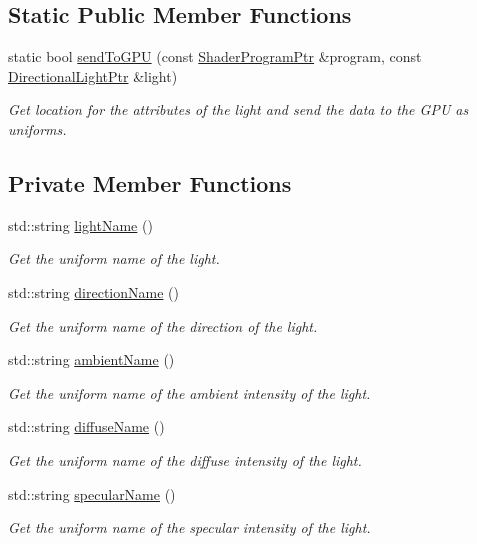 \subsection*{Static Public Member Functions}
\begin{DoxyCompactItemize}
\item 
static bool \hyperlink{classDirectionalLight_a0dbd9593486ae29871f6cce9f62a9b2b}{send\+To\+G\+P\+U} (const \hyperlink{ShaderProgram_8hpp_af8e4af1ad4c53875ee5d32ab7e1f4966}{Shader\+Program\+Ptr} \&program, const \hyperlink{classDirectionalLight_abb43c478c01d5e7c158699e9f3661bce}{Directional\+Light\+Ptr} \&light)
\begin{DoxyCompactList}\small\item\em Get location for the attributes of the light and send the data to the G\+P\+U as uniforms. \end{DoxyCompactList}\end{DoxyCompactItemize}
\subsection*{Private Member Functions}
\begin{DoxyCompactItemize}
\item 
std\+::string \hyperlink{classDirectionalLight_ac3320ddae5142ae1e96db3b4e6874ff4}{light\+Name} ()
\begin{DoxyCompactList}\small\item\em Get the uniform name of the light. \end{DoxyCompactList}\item 
std\+::string \hyperlink{classDirectionalLight_a7f77772f2c797d04935d7c041bb7c717}{direction\+Name} ()
\begin{DoxyCompactList}\small\item\em Get the uniform name of the direction of the light. \end{DoxyCompactList}\item 
std\+::string \hyperlink{classDirectionalLight_a028a58bf7d60840548f85339086d2607}{ambient\+Name} ()
\begin{DoxyCompactList}\small\item\em Get the uniform name of the ambient intensity of the light. \end{DoxyCompactList}\item 
std\+::string \hyperlink{classDirectionalLight_a8226d712ae3399d6e90ce2ffa55b7f2d}{diffuse\+Name} ()
\begin{DoxyCompactList}\small\item\em Get the uniform name of the diffuse intensity of the light. \end{DoxyCompactList}\item 
std\+::string \hyperlink{classDirectionalLight_ac08e88f445126ad6f26be6459aead7ba}{specular\+Name} ()
\begin{DoxyCompactList}\small\item\em Get the uniform name of the specular intensity of the light. \end{DoxyCompactList}\end{DoxyCompactItemize}
